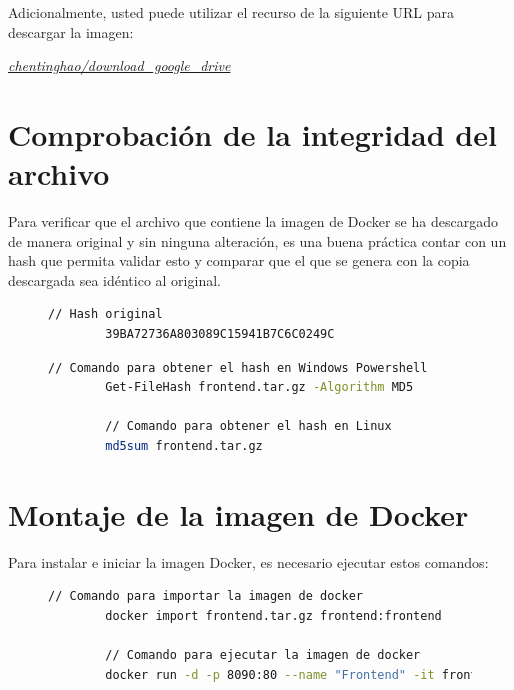 \documentclass[11pt,a4paper]{article}
\begin{document}
Adicionalmente, usted puede utilizar el recurso de la siguiente URL para descargar la imagen:\par
\centerline{\textit{\href{https://github.com/chentinghao/download_google_drive}{chentinghao/download\_google\_drive}}}

\vspace{5cm}

\section{Comprobación de la integridad del archivo}
Para verificar que el archivo que contiene la imagen de Docker se ha descargado de manera original 
y sin ninguna alteración, es una buena práctica contar con un hash que permita validar esto y comparar
que el que se genera con la copia descargada sea idéntico al original.\par

\begin{figure}[h]
    \begin{lstlisting}[language=Bash]
        // Hash original
        39BA72736A803089C15941B7C6C0249C
    \end{lstlisting}
\end{figure}

\begin{figure}[h]
    \begin{lstlisting}[language=Bash]
        // Comando para obtener el hash en Windows Powershell
        Get-FileHash frontend.tar.gz -Algorithm MD5

        // Comando para obtener el hash en Linux
        md5sum frontend.tar.gz
    \end{lstlisting}
\end{figure}

\newpage

\section{Montaje de la imagen de Docker}
Para instalar e iniciar la imagen Docker, es necesario ejecutar estos comandos:

\begin{figure}[h]
    \begin{lstlisting}[language=Bash]
        // Comando para importar la imagen de docker
        docker import frontend.tar.gz frontend:frontend

        // Comando para ejecutar la imagen de docker
        docker run -d -p 8090:80 --name "Frontend" -it frontend nginx -g "daemon off;"
    \end{lstlisting}
\end{figure}
\end{document}
